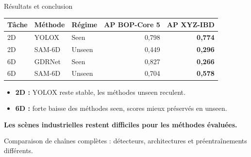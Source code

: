\documentclass[aspectratio=169,11pt]{beamer}
\newcommand{\framesource}{}
\newcommand{\src}[1]{\gdef\framesource{#1}}
\newcommand{\key}[1]{{\color{teal}\bfseries #1}}
\newcommand{\smalltxt}{\fontsize{19}{24}\selectfont}
\newcommand{\captiontxt}{\fontsize{17}{21}\selectfont}
\begin{document}
\begin{frame}{Résultats et conclusion}
\src{Huang et al., sélection du tableau 4 et §4.4--4.5. BOP-Core 5 : moyenne des cinq datasets comparés.}
\centering
{\smalltxt
\renewcommand{\arraystretch}{1.6}
\begin{tabularx}{.94\textwidth}{@{}lXlrr@{}}
\toprule
\textbf{Tâche} & \textbf{Méthode} & \textbf{Régime} &
\textbf{AP BOP-Core 5} & \textbf{AP XYZ-IBD}\\
\midrule
2D & YOLOX & Seen & 0,798 & \textbf{0,774}\\
2D & SAM-6D & Unseen & 0,449 & \textbf{0,296}\\
\midrule
6D & GDRNet & Seen & 0,827 & \textbf{0,266}\\
6D & SAM-6D & Unseen & 0,704 & \textbf{0,578}\\
\bottomrule
\end{tabularx}}
\par\vspace{5mm}
\raggedright
\begin{itemize}\setlength\itemsep{3mm}
\item \textbf{2D :} YOLOX reste stable, les méthodes unseen reculent.
\item \textbf{6D :} forte baisse des méthodes seen, scores mieux préservés en unseen.
\end{itemize}
\par\vspace{4mm}
\key{Les scènes industrielles restent difficiles pour les méthodes évaluées.}
\par\vspace{2mm}
{\captiontxt\color{muted}Comparaison de chaînes complètes : détecteurs, architectures et préentraînements différents.}
\end{frame}
\end{document}
